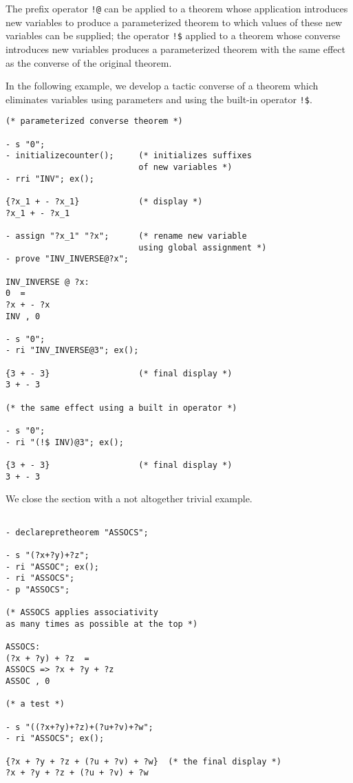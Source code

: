 \documentclass{kluwer}
\begin{document}
\begin{article}
\begin{description}
The prefix operator {\tt !@} can be applied to a theorem whose
application introduces new variables to produce a parameterized
theorem to which values of these new variables can be supplied; the
operator {\tt !\$} applied to a theorem whose converse introduces new
variables produces a parameterized theorem with the same effect as the
converse of the original theorem.

In the following example, we develop a tactic converse of a theorem
which eliminates variables using parameters and using the built-in
operator {\tt !\$}.

\begin{verbatim}
(* parameterized converse theorem *)

- s "0";
- initializecounter();     (* initializes suffixes 
                           of new variables *)
- rri "INV"; ex();

{?x_1 + - ?x_1}            (* display *)
?x_1 + - ?x_1

- assign "?x_1" "?x";      (* rename new variable 
                           using global assignment *)
- prove "INV_INVERSE@?x";

INV_INVERSE @ ?x:  
0  =  
?x + - ?x
INV , 0

- s "0";
- ri "INV_INVERSE@3"; ex();

{3 + - 3}                  (* final display *)
3 + - 3

(* the same effect using a built in operator *)

- s "0";
- ri "(!$ INV)@3"; ex();

{3 + - 3}                  (* final display *)
3 + - 3
\end{verbatim}


\end{description}

We close the section with a not altogether trivial example.

\begin{verbatim}

- declarepretheorem "ASSOCS";

- s "(?x+?y)+?z";
- ri "ASSOC"; ex();
- ri "ASSOCS";
- p "ASSOCS";

(* ASSOCS applies associativity 
as many times as possible at the top *)

ASSOCS:  
(?x + ?y) + ?z  =  
ASSOCS => ?x + ?y + ?z
ASSOC , 0

(* a test *)

- s "((?x+?y)+?z)+(?u+?v)+?w";
- ri "ASSOCS"; ex();

{?x + ?y + ?z + (?u + ?v) + ?w}  (* the final display *)
?x + ?y + ?z + (?u + ?v) + ?w


\end{verbatim}
\end{article}
\end{document}
